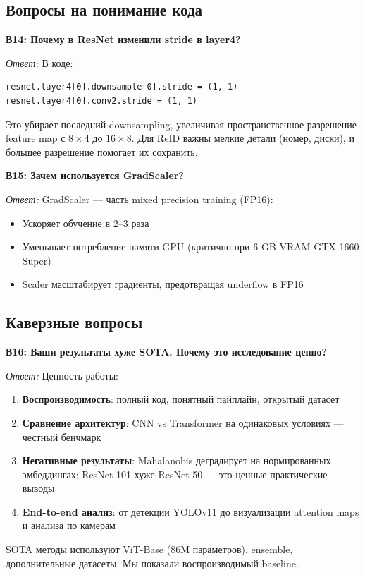 \documentclass[a4paper, 12pt]{article}
\begin{document}
\subsection*{Вопросы на понимание кода}

\textbf{В14: Почему в ResNet изменили stride в layer4?}

\textit{Ответ:} В коде:
\begin{verbatim}
resnet.layer4[0].downsample[0].stride = (1, 1)
resnet.layer4[0].conv2.stride = (1, 1)
\end{verbatim}
Это убирает последний downsampling, увеличивая пространственное разрешение feature map с $8\times4$ до $16\times8$. Для ReID важны мелкие детали (номер, диски), и большее разрешение помогает их сохранить.

\vspace{1em}
\textbf{В15: Зачем используется GradScaler?}

\textit{Ответ:} GradScaler --- часть mixed precision training (FP16):
\begin{itemize}
  \item Ускоряет обучение в 2--3 раза
  \item Уменьшает потребление памяти GPU (критично при 6 GB VRAM GTX 1660 Super)
  \item Scaler масштабирует градиенты, предотвращая underflow в FP16
\end{itemize}

\subsection*{Каверзные вопросы}

\textbf{В16: Ваши результаты хуже SOTA. Почему это исследование ценно?}

\textit{Ответ:} Ценность работы:
\begin{enumerate}
  \item \textbf{Воспроизводимость}: полный код, понятный пайплайн, открытый датасет
  \item \textbf{Сравнение архитектур}: CNN vs Transformer на одинаковых условиях --- честный бенчмарк
  \item \textbf{Негативные результаты}: Mahalanobis деградирует на нормированных эмбеддингах; ResNet-101 хуже ResNet-50 --- это ценные практические выводы
  \item \textbf{End-to-end анализ}: от детекции YOLOv11 до визуализации attention maps и анализа по камерам
\end{enumerate}
SOTA методы используют ViT-Base (86M параметров), ensemble, дополнительные датасеты. Мы показали воспроизводимый baseline.
\end{document}
